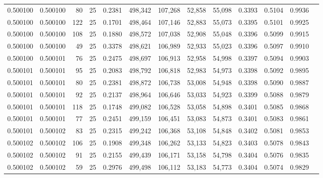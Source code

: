 \begin{tabular}{rrrrrrrrrrrrr}
0.500100 & 0.500100 &    80 &  25 &                                     0.2381 & 498,342 & 107,268 &  52,858 &  55,098 & 0.3393 & 0.5104 & 0.9936 \\
0.500100 & 0.500100 &   122 &  25 &                                     0.1701 & 498,464 & 107,146 &  52,883 &  55,073 & 0.3395 & 0.5101 & 0.9925 \\
0.500100 & 0.500100 &   108 &  25 &                                     0.1880 & 498,572 & 107,038 &  52,908 &  55,048 & 0.3396 & 0.5099 & 0.9915 \\
0.500100 & 0.500100 &    49 &  25 &                                     0.3378 & 498,621 & 106,989 &  52,933 &  55,023 & 0.3396 & 0.5097 & 0.9910 \\
0.500100 & 0.500101 &    76 &  25 &                                     0.2475 & 498,697 & 106,913 &  52,958 &  54,998 & 0.3397 & 0.5094 & 0.9903 \\
0.500101 & 0.500101 &    95 &  25 &                                     0.2083 & 498,792 & 106,818 &  52,983 &  54,973 & 0.3398 & 0.5092 & 0.9895 \\
0.500101 & 0.500101 &    80 &  25 &                                     0.2381 & 498,872 & 106,738 &  53,008 &  54,948 & 0.3398 & 0.5090 & 0.9887 \\
0.500101 & 0.500101 &    92 &  25 &                                     0.2137 & 498,964 & 106,646 &  53,033 &  54,923 & 0.3399 & 0.5088 & 0.9879 \\
0.500101 & 0.500101 &   118 &  25 &                                     0.1748 & 499,082 & 106,528 &  53,058 &  54,898 & 0.3401 & 0.5085 & 0.9868 \\
0.500101 & 0.500101 &    77 &  25 &                                     0.2451 & 499,159 & 106,451 &  53,083 &  54,873 & 0.3401 & 0.5083 & 0.9861 \\
0.500101 & 0.500102 &    83 &  25 &                                     0.2315 & 499,242 & 106,368 &  53,108 &  54,848 & 0.3402 & 0.5081 & 0.9853 \\
0.500102 & 0.500102 &   106 &  25 &                                     0.1908 & 499,348 & 106,262 &  53,133 &  54,823 & 0.3403 & 0.5078 & 0.9843 \\
0.500102 & 0.500102 &    91 &  25 &                                     0.2155 & 499,439 & 106,171 &  53,158 &  54,798 & 0.3404 & 0.5076 & 0.9835 \\
0.500102 & 0.500102 &    59 &  25 &                                     0.2976 & 499,498 & 106,112 &  53,183 &  54,773 & 0.3404 & 0.5074 & 0.9829 \\

\end{tabular}
